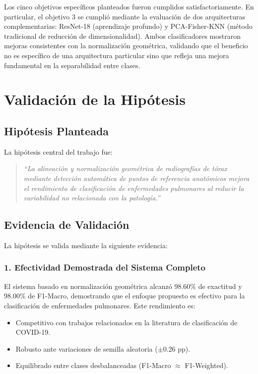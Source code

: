 Los cinco objetivos específicos planteados fueron cumplidos satisfactoriamente. En particular, el objetivo 3 se cumplió mediante la evaluación de dos arquitecturas complementarias: ResNet-18 (aprendizaje profundo) y PCA-Fisher-KNN (método tradicional de reducción de dimensionalidad). Ambos clasificadores mostraron mejoras consistentes con la normalización geométrica, validando que el beneficio no es específico de una arquitectura particular sino que refleja una mejora fundamental en la separabilidad entre clases.

\section{Validación de la Hipótesis}
\label{sec:validacion_hipotesis}

\subsection{Hipótesis Planteada}
\label{subsec:hipotesis_planteada}

La hipótesis central del trabajo fue:

\begin{quote}
\textit{``La alineación y normalización geométrica de radiografías de tórax mediante detección automática de puntos de referencia anatómicos mejora el rendimiento de clasificación de enfermedades pulmonares al reducir la variabilidad no relacionada con la patología.''}
\end{quote}

\subsection{Evidencia de Validación}
\label{subsec:evidencia_validacion}

La hipótesis se valida mediante la siguiente evidencia:

\subsubsection{1. Efectividad Demostrada del Sistema Completo}

El sistema basado en normalización geométrica alcanzó 98.60\% de exactitud y 98.00\% de F1-Macro, demostrando que el enfoque propuesto es efectivo para la clasificación de enfermedades pulmonares. Este rendimiento es:
\begin{itemize}
    \item Competitivo con trabajos relacionados en la literatura de clasificación de COVID-19.
    \item Robusto ante variaciones de semilla aleatoria ($\pm$0.26 pp).
    \item Equilibrado entre clases desbalanceadas (F1-Macro $\approx$ F1-Weighted).
\end{itemize}

